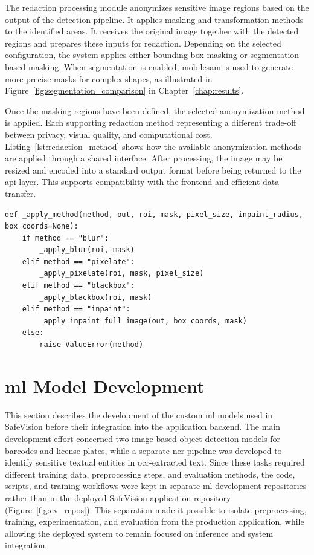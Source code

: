 The redaction processing module anonymizes sensitive image regions based on the output of the detection pipeline. It applies \gls{masking} and transformation methods to the identified areas. It receives the original image together with the detected regions and prepares these inputs for redaction. Depending on the selected configuration, the system applies either \gls{bounding box} \gls{masking} or \gls{segmentation} based \gls{masking}. When \gls{segmentation} is enabled, \gls{mobilesam} is used to generate more precise masks for complex shapes, as illustrated in Figure~\ref{fig:segmentation_comparison} in Chapter~\ref{chap:results}.

Once the \gls{masking} regions have been defined, the selected \gls{anonymization} method is applied. Each supporting redaction method representing a different trade-off between privacy, visual quality, and computational cost. Listing~\ref{lst:redaction_method} shows how the available \gls{anonymization} methods are applied through a shared interface. After processing, the image may be resized and encoded into a standard output format before being returned to the \acrshort{api} layer. This supports compatibility with the frontend and efficient data transfer.

\begin{lstlisting}[caption={Application of redaction methods}, label={lst:redaction_method}]
def _apply_method(method, out, roi, mask, pixel_size, inpaint_radius, box_coords=None):
    if method == "blur":
        _apply_blur(roi, mask)
    elif method == "pixelate":
        _apply_pixelate(roi, mask, pixel_size)
    elif method == "blackbox":
        _apply_blackbox(roi, mask)
    elif method == "inpaint":
        _apply_inpaint_full_image(out, box_coords, mask)
    else:
        raise ValueError(method)
\end{lstlisting}






\section{\acrshort{ml} Model Development}

This section describes the development of the custom \acrshort{ml} models used in \gls{SafeVision} before their integration into the application backend. The main development effort concerned two image-based \gls{object detection} models for barcodes and license plates, while a separate \acrshort{ner} pipeline was developed to identify sensitive textual entities in \acrshort{ocr}-extracted text. Since these tasks required different training data, preprocessing steps, and evaluation methods, the code, scripts, and training workflows were kept in separate \acrshort{ml} development repositories rather than in the deployed \gls{SafeVision} application repository (Figure~\ref{fig:cv_repos}). This separation made it possible to isolate preprocessing, training, experimentation, and evaluation from the production application, while allowing the deployed system to remain focused on \gls{inference} and system integration.

